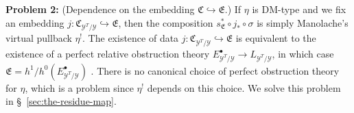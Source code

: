 \documentclass[12pt,dvipsnames]{amsart}
\begin{document}
\bigskip

\noindent\textbf{Problem 2:} (Dependence on the embedding \(\mathfrak C\hookrightarrow \mathfrak E\).) If \(\eta\) is DM-type and we fix an embedding \(j:\mathfrak C_{\mathcal Y^T/\mathcal Y}\hookrightarrow \mathfrak E\), then the composition \(s^*_{\mathfrak E}\circ j_*\circ \sigma\) is simply Manolache's virtual pullback \(\eta^!\). The existence of data \(j:\mathfrak C_{\mathcal Y^T/\mathcal Y}\hookrightarrow \mathfrak E\) is equivalent to the existence of a perfect relative obstruction theory \(E^\bullet_{\mathcal Y^T/\mathcal Y} \to L_{\mathcal Y^T/\mathcal Y}\), in which case \(\mathfrak E = h^1/h^0(E^\bullet_{\mathcal Y^T/\mathcal Y})\) \cite[Proposition 3.11]{manolache_VirtualPullbacks2012}. There is no canonical choice of perfect obstruction theory for \(\eta\), which is a problem since \(\eta^!\) depends on this choice. We solve this problem in \S~\ref{sec:the-residue-map}.



\end{document}
